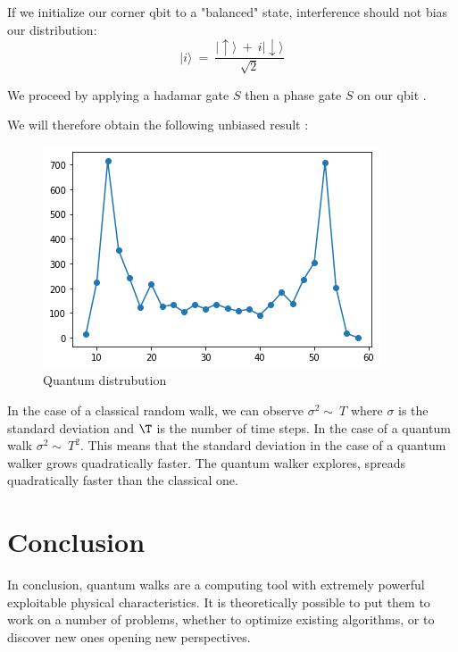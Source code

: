 \documentclass[9pt,journal,compsoc]{IEEEtran}
\begin{document}
        If we initialize our corner qbit to a "balanced" state, interference should not bias our distribution:
        $$\lvert i\rangle \ = \ \frac{\lvert\uparrow\rangle \ + \ i\lvert\downarrow\rangle}{\sqrt{2}}$$

        We proceed by applying a hadamar gate $S$ then a phase gate $S$ on our qbit \cite{morvan2021qutrit}.
        
        We will therefore obtain the following unbiased result \cite{kempe2003quantum} \cite{quantumaiQuantumWalk}:
        \begin{figure}[htp!]
            \centering
            \includegraphics[scale=0.4]{assets/img/quantum_distribution.png}
            \caption{Quantum distrubution\cite{QuantumDemoDauliac2022}}
            \label{fig:opposing}
        \end{figure}
        In the case of a classical random walk, we can observe $\sigma^2 \sim \ T$ where $\sigma$ is the standard deviation and $\T$ is the number of time steps.
        In the case of a quantum walk $\sigma^2 \sim \ T^2$.
        This means that the standard deviation in the case of a quantum walker grows quadratically faster.
        The quantum walker explores, spreads quadratically faster than the classical one.


    \section{Conclusion}
    
        In conclusion, quantum walks are a computing tool with extremely powerful exploitable physical characteristics.
        It is theoretically possible to put them to work on a number of problems, whether to optimize existing algorithms, or to discover new ones opening new perspectives.
    \nocite{*}
    
    
    
    
\end{document}
